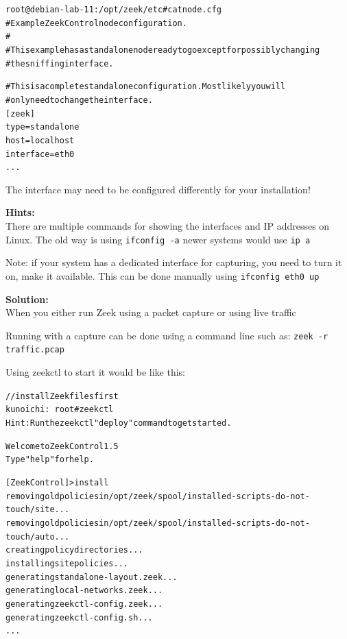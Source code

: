 \documentclass[a4paper,11pt,notitlepage]{report}
\begin{document}
\begin{alltt}
root@debian-lab-11:/opt/zeek/etc# cat node.cfg
# Example ZeekControl node configuration.
#
# This example has a standalone node ready to go except for possibly changing
# the sniffing interface.

# This is a complete standalone configuration.  Most likely you will
# only need to change the interface.
[zeek]
type=standalone
host=localhost
interface=eth0
...
\end{alltt}

The interface may need to be configured differently for your installation!

{\bf Hints:}\\
There are multiple commands for showing the interfaces and IP addresses on Linux. The old way is using \verb+ifconfig -a+ newer systems would use \verb+ip a+

Note: if your system has a dedicated interface for capturing, you need to turn it on, make it available. This can be done manually using \verb+ifconfig eth0 up+

{\bf Solution:}\\
When you either run Zeek using a packet capture or using live traffic

Running with a capture can be done using a command line such as:
\verb+zeek -r traffic.pcap+

Using zeekctl to start it would be like this:
\begin{alltt}\small
// install Zeek files first
kunoichi:~ root# zeekctl
Hint: Run the zeekctl "deploy" command to get started.

Welcome to ZeekControl 1.5
Type "help" for help.

[ZeekControl] > install
removing old policies in /opt/zeek/spool/installed-scripts-do-not-touch/site ...
removing old policies in /opt/zeek/spool/installed-scripts-do-not-touch/auto ...
creating policy directories ...
installing site policies ...
generating standalone-layout.zeek ...
generating local-networks.zeek ...
generating zeekctl-config.zeek ...
generating zeekctl-config.sh ...
...
\end{alltt}
\end{document}
